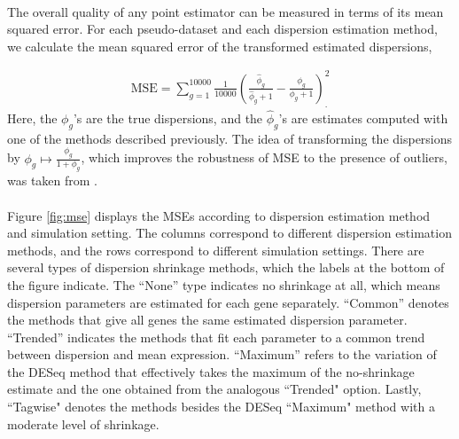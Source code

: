 \documentclass[10pt]{article}
\providecommand{\wh}[1]{\widehat{#1}}
\begin{document}
\paragraph{} \indent The overall quality of any point estimator can be measured in terms of its mean squared error. For each pseudo-dataset and each dispersion estimation method, we calculate the mean squared error of the transformed estimated dispersions,

\begin{align*}
\text{MSE} = \sum_{g = 1}^{10000} \frac{1}{10000} \left ( \frac{\wh{\phi}_g}{\wh{\phi}_g + 1} - \frac{\phi_g}{\phi_g + 1} \right )^2_.
\end{align*} Here, the $\phi_g$'s are the true dispersions, and the $\wh{\phi}_g$'s are estimates computed with one of the methods described previously. The idea of transforming the dispersions by $\phi_g \mapsto\frac{\phi_g}{1+\phi_g}$, which improves the robustness of MSE to the presence of outliers, was taken from \cite{rs07}.

\paragraph{} \indent Figure \ref{fig:mse} displays the MSEs according to dispersion estimation method and simulation setting. The columns correspond to different dispersion estimation methods, and the rows correspond to different simulation settings. There are several types of dispersion shrinkage methods, which the labels at the bottom of the figure indicate. The ``None'' type indicates no shrinkage at all, which means dispersion parameters are estimated for each gene separately. ``Common'' denotes the methods that give all genes the same estimated dispersion parameter. ``Trended'' indicates the methods that fit each parameter to a common trend between dispersion and mean expression. ``Maximum'' refers to the variation of the DESeq method that effectively takes the maximum of the no-shrinkage estimate and the one obtained from the analogous ``Trended" option. Lastly, ``Tagwise" denotes the methods besides the DESeq ``Maximum" method with a moderate level of shrinkage.
\end{document}
